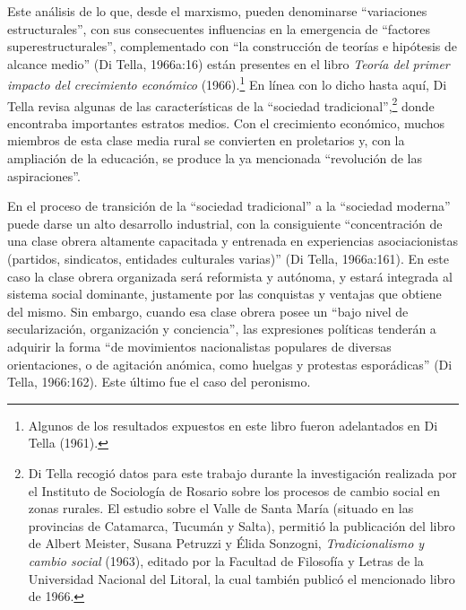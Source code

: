 Este análisis de lo que, desde el marxismo, pueden denominarse \enquote{variaciones estructurales}, con sus consecuentes influencias en la emergencia de \enquote{factores superestructurales}, complementado con \enquote{la construcción de teorías e hipótesis de alcance medio} (Di Tella, 1966a:16) están presentes en el libro \emph{Teoría del primer impacto del crecimiento económico} (1966).\footnote{Algunos de los resultados expuestos en este libro fueron adelantados en Di Tella (1961).} En línea con lo dicho hasta aquí, Di Tella revisa algunas de las características de la \enquote{sociedad tradicional},\footnote{Di Tella recogió datos para este trabajo durante la investigación realizada por el Instituto de Sociología de Rosario sobre los procesos de cambio social en zonas rurales. El estudio sobre el Valle de Santa María (situado en las provincias de Catamarca, Tucumán y Salta), permitió la publicación del libro de Albert Meister, Susana Petruzzi y Élida Sonzogni, \emph{Tradicionalismo y cambio social} (1963), editado por la Facultad de Filosofía y Letras de la Universidad Nacional del Litoral, la cual también publicó el mencionado libro de 1966.} donde encontraba importantes estratos medios. Con el crecimiento económico, muchos miembros de esta clase media rural se convierten en proletarios y, con la ampliación de la educación, se produce la ya mencionada \enquote{revolución de las aspiraciones}.

En el proceso de transición de la \enquote{sociedad tradicional} a la \enquote{sociedad moderna} puede darse un alto desarrollo industrial, con la consiguiente \enquote{concentración de una clase obrera altamente capacitada y entrenada en experiencias asociacionistas (partidos, sindicatos, entidades culturales varias)} (Di Tella, 1966a:161). En este caso la clase obrera organizada será reformista y autónoma, y estará integrada al sistema social dominante, justamente por las conquistas y ventajas que obtiene del mismo. Sin embargo, cuando esa clase obrera posee un \enquote{bajo nivel de secularización, organización y conciencia}, las expresiones políticas tenderán a adquirir la forma \enquote{de movimientos nacionalistas populares de diversas orientaciones, o de agitación anómica, como huelgas y protestas esporádicas} (Di Tella, 1966:162). Este último fue el caso del peronismo.

